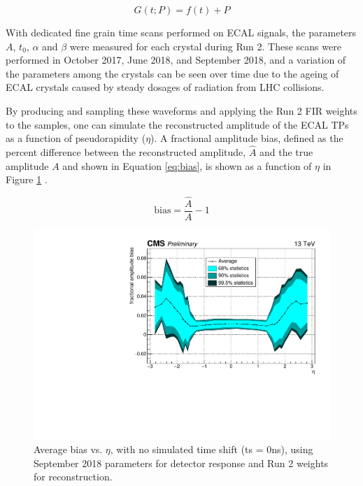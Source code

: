 \begin{equation} \label{eq:FullECALresponsefcn}
G(t;P) = f(t)+P
\end{equation}

With dedicated fine grain time scans performed on ECAL signals, the parameters $A$, $t_{0}$, $\alpha$ and $\beta$ were measured for each crystal during Run 2. These scans were performed in October 2017, June 2018, and September 2018, and a variation of the parameters among the crystals can be seen over time due to the ageing of ECAL crystals caused by steady dosages of radiation from LHC collisions. 

By producing and sampling these waveforms and applying the Run 2 FIR weights to the samples, one can simulate the reconstructed amplitude of the ECAL TPs as a function of pseudorapidity ($\eta$). A fractional amplitude bias, defined as the percent difference between the reconstructed amplitude, $\hat{A}$ and the true amplitude $A$ and shown in Equation \ref{eq:bias}, is shown as a function of $\eta$ in Figure \ref{fig:ampBiasvseta} \cite{CMS-DP-2019-031, CMS-DP-2019-031_Plots}. 

\begin{equation} \label{eq:bias}
    \text{bias} = \frac{\hat{A}}{A} - 1
\end{equation}

\begin{figure}[H]
    \centering
    \includegraphics[width=\textwidth]{Images/ECAL/TPG/AmpBias_vs_eta_Sep18_ps.pdf}
    \caption{Average bias vs. $\eta$, with no simulated time shift (ts = 0ns), using September 2018 parameters for detector response and Run 2 weights for reconstruction.}
    \label{fig:ampBiasvseta}
\end{figure}

